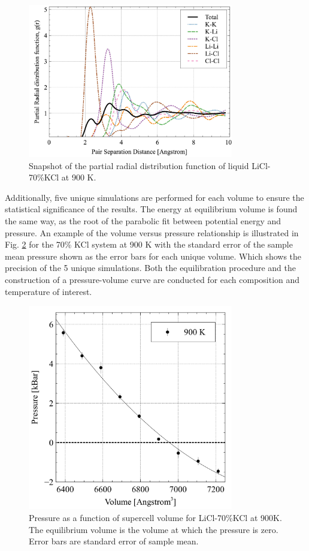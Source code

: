 \documentclass[review]{elsarticle}
\begin{document}
 \begin{figure}[h]
 \centering
 \includegraphics[width=0.8\textwidth]{images/Partial_RDF.jpg} \caption{Snapshot of the partial radial distribution function of liquid LiCl-70\%KCl at 900 K.}
 \label{fig:rdf}
 \end{figure}
 Additionally, five unique simulations are performed for each volume to ensure the statistical significance of the results. The energy at equilibrium volume is found the same way, as the root of the parabolic fit between potential energy and pressure. An example of the volume versus pressure relationship is illustrated in Fig. \ref{fig:VvsP} for the 70\% KCl system at 900 K with the standard error of the sample mean pressure shown as the error bars for each unique volume.  Which shows the precision of the 5 unique simulations. Both the equilibration procedure and the construction of a pressure-volume curve are conducted for each composition and temperature of interest.

 \begin{figure}[h]
 \centering
 \includegraphics[width=0.8\textwidth]{images/PressureVsVolume.jpg} 
 \caption{Pressure as a function of supercell volume for LiCl-70\%KCl at 900K. The equilibrium volume is the volume at which the pressure is zero. Error bars are standard error of sample mean.}
 \label{fig:VvsP}
\end{figure}
\end{document}

